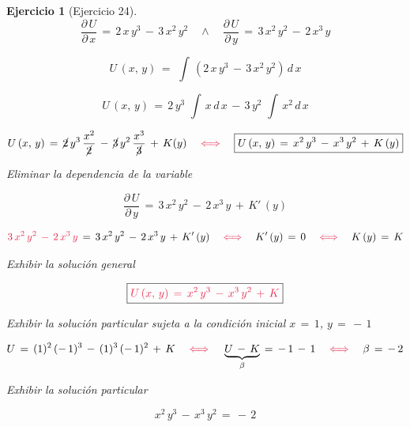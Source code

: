 \documentclass[a4paper,11pt]{book}
\newtheorem{ejer}{Ejercicio}[section]
\begin{document}
\begin{ejer}[Ejercicio 24]
  

$$\boxed{\dfrac{\partial\,U}{\partial\,x}\,=\,2\,x\,y^{3}\,-\,3\,x^{2}\,y^{2}} \quad \wedge \quad \boxed{\dfrac{\partial\,U}{\partial\,y}\,=\,3\,x^{2}\,y^{2}\,-\,2\,x^{3}\,y} $$ 

  

$$U\,(x,\,y)\,=\,\displaystyle\,\int\,\left(2\,x\,y^{3}\,-\,3\,x^{2}\,y^{2} \right)\,d\,x$$ 

  

$$U\,(x,\,y)\,=\,2\,y^{3}\,\displaystyle\,\int\,x\,d\,x\,-\,3\,y^{2}\,\displaystyle\,\int\,x^{2}\,d\,x$$ 

  

$$U\,(x,\,y)\,=\,\cancel{2}\,y^{3}\,\dfrac{x^{2}}{\cancel{2}}\,-\,\cancel{3}\,y^{2}\,\dfrac{x^{3}}{\cancel{3}}\,+\,K(y) \quad \textcolor{amaranth}{\iff} \quad \boxed{U\,(x,\,y)\,=\,x^{2}\,y^{3}\,-\,x^{3}\,y^{2}\,+\,K\,(y)}$$ 

  

 Eliminar la dependencia de la variable 

  

$$\dfrac{\partial\,U}{\partial\,y}\,=\,3\,x^{2}\,y^{2}\,-\,2\,x^{3}\,y\,+\,K'\,(y)$$ 

  

$$\textcolor{amaranth}{3\,x^{2}\,y^{2}\,-\,2\,x^{3}\,y}\,=\,3\,x^{2}\,y^{2}\,-\,2\,x^{3}\,y\,+\,K'\,(y) \quad \textcolor{amaranth}{\iff} \quad K'\,(y)\,=\,0 \quad \textcolor{amaranth}{\iff} \quad K\,(y)\,=\,K$$ 

  

 Exhibir la solución general 

  

$$\boxed{\textcolor{amaranth}{U\,(x,\,y)\,=\,x^{2}\,y^{3}\,-\,x^{3}\,y^{2}\,+\,K}} $$ 

  

 Exhibir la solución particular sujeta a la condición inicial $x\,=\,1$, $y\,=\,-\,1$ 

  

$$U\,=\,(1)^{2}\,(-\,1)^{3}\,-\,(1)^{3}\,(-\,1)^{2}\,+\,K \quad \textcolor{amaranth}{\iff} \quad \underbrace{U\,-\,K}_{\beta}\,=\,-\,1\,-\,1 \quad \textcolor{amaranth}{\iff} \quad \beta\,=\,-\,2$$ 

  

 Exhibir la solución particular 

  

$$\boxed{x^{2}\,y^{3}\,-\,x^{3}\,y^{2}\,=\,-\,2} $$ 

  



\end{ejer} 
\end{document}
